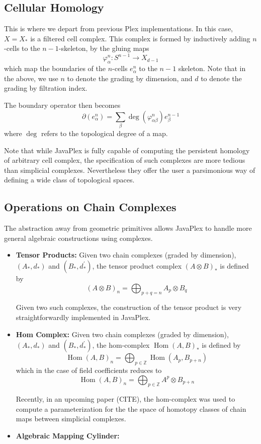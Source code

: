 \documentclass[10pt]{article}
\newcommand{\Hom}{\operatorname{Hom}}
\begin{document}
\subsection{Cellular Homology}

This is where we depart from previous Plex implementations. In this case, $X = X_*$ is a filtered cell complex. This complex is formed by inductively adding $n$-cells to the $n-1$-skeleton, by the gluing maps 
$$\varphi_{\alpha}^n: S^{n-1} \rightarrow X_{d-1}$$
which map the boundaries of the $n$-cells $e_{\alpha}^n$ to the $n-1$ skeleton. Note that in the above, we use $n$ to denote the grading by dimension, and $d$ to denote the grading by filtration index.

The boundary operator then becomes 
$$\partial(e_{\alpha}^n) = \sum_{\beta} \deg(\varphi_{\alpha \beta}^n) e_{\beta}^{n-1}$$
where $\deg$ refers to the topological degree of a map.

Note that while JavaPlex is fully capable of computing the persistent homology of arbitrary cell complex, the specification of such complexes are more tedious than simplicial complexes. Nevertheless they offer the user a parsimonious way of defining a wide class of topological spaces.

\subsection{Operations on Chain Complexes}

The abstraction away from geometric primitives allows JavaPlex to handle more general algebraic constructions using complexes.

\begin{itemize}
\item {\bf Tensor Products:} Given two chain complexes (graded by dimension), $(A_*, d_*)$ and $(B_*, d^{\prime}_*)$, the tensor product complex $(A \otimes B)_*$ is defined by
$$(A \otimes B)_n = \bigoplus_{p + q = n} A_p \otimes B_q$$

Given two such complexes, the construction of the tensor product is very straightforwardly implemented in JavaPlex. 

\item {\bf Hom Complex:} Given two chain complexes (graded by dimension), $(A_*, d_*)$ and $(B_*, d^{\prime}_*)$, the hom-complex $\Hom(A,B)_*$ is defined by
$$\Hom(A, B)_n = \bigoplus_{p \in \mathbb{Z}} \Hom(A_p, B_{p + n})$$
which in the case of field coefficients reduces to 
$$\Hom(A, B)_n = \bigoplus_{p \in \mathbb{Z}} A^p \otimes B_{p + n}$$

Recently, in an upcoming paper (CITE), the hom-complex was used to compute a parameterization for the the space of homotopy classes of chain maps between simplicial complexes.

\item {\bf Algebraic Mapping Cylinder:}

\end{itemize}
\end{document}
